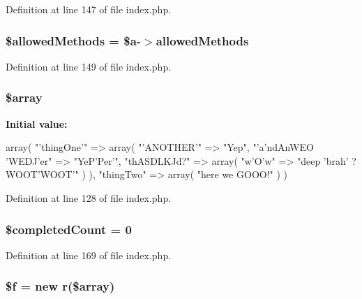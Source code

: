 Definition at line 147 of file index.\-php.

\hypertarget{index_8php_ab278eba7cab5341dacdccecd7a2cc2df}{
\subsubsection[{\$allowed\-Methods}]{\setlength{\rightskip}{0pt plus 5cm}\$allowed\-Methods = \$a-\/$>$allowed\-Methods}}\label{index_8php_ab278eba7cab5341dacdccecd7a2cc2df}


Definition at line 149 of file index.\-php.

\hypertarget{index_8php_ac1361b8d873c1f927b21b809f99e5752}{
\subsubsection[{\$array}]{\setlength{\rightskip}{0pt plus 5cm}\$array}}\label{index_8php_ac1361b8d873c1f927b21b809f99e5752}
{\bfseries Initial value\-:}
\begin{DoxyCode}
 array(
                "'thingOne'" => array(
                        "'ANOTHER'" => "Yep",
                        "'a'ndAnWEO 'WEDJ'er" => "YeP'Per'",
                        "thASDLKJd?" => array(
                                "w'O'w" => "deep 'brah' ?WOOT'WOOT'"
                        )
                ),
                "thingTwo" => array(
                        "here we GOOO!"
                )
        )
\end{DoxyCode}


Definition at line 128 of file index.\-php.

\hypertarget{index_8php_a51c734a41c7747051953ec3d78dd1c5b}{
\subsubsection[{\$completed\-Count}]{\setlength{\rightskip}{0pt plus 5cm}\$completed\-Count = 0}}\label{index_8php_a51c734a41c7747051953ec3d78dd1c5b}


Definition at line 169 of file index.\-php.

\hypertarget{index_8php_a23c42e7d231a63025b55e4eb7e3d4c99}{
\subsubsection[{\$f}]{\setlength{\rightskip}{0pt plus 5cm}\$f = new {\bf r}(\$array)}}\label{index_8php_a23c42e7d231a63025b55e4eb7e3d4c99}


